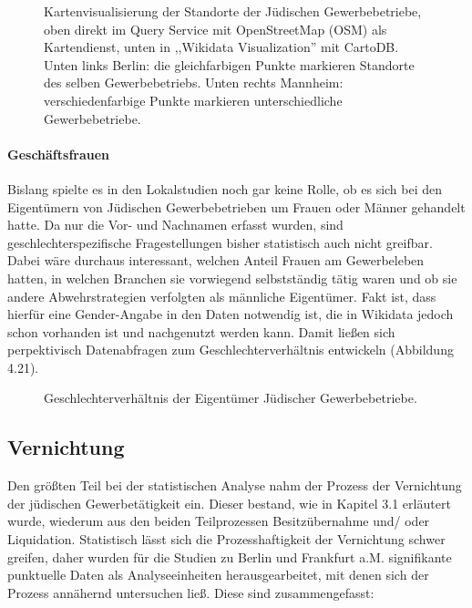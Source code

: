 \begin{figure}[h]
    \centering
    \caption{Kartenvisualisierung der Standorte der Jüdischen Gewerbebetriebe, oben direkt im Query Service mit OpenStreetMap (OSM) als Kartendienst, unten in ,,Wikidata Visualization'' mit CartoDB. Unten links Berlin: die gleichfarbigen Punkte markieren Standorte des selben Gewerbebetriebs. Unten rechts Mannheim: verschiedenfarbige Punkte markieren unterschiedliche Gewerbebetriebe.}
    \label{fig:x cubed graph}
\end{figure}

\paragraph{Geschäftsfrauen}
Bislang spielte es in den Lokalstudien noch gar keine Rolle, ob es sich bei den Eigentümern von Jüdischen Gewerbebetrieben um Frauen oder Männer gehandelt hatte. Da nur die Vor- und Nachnamen erfasst wurden, sind geschlechterspezifische Fragestellungen bisher statistisch auch nicht greifbar. Dabei wäre durchaus interessant, welchen Anteil Frauen am Gewerbeleben hatten, in welchen Branchen sie vorwiegend selbstständig tätig waren und ob sie andere Abwehrstrategien verfolgten als männliche Eigentümer. Fakt ist, dass hierfür eine Gender-Angabe in den Daten notwendig ist, die in Wikidata jedoch schon vorhanden ist und nachgenutzt werden kann. Damit ließen sich perpektivisch Datenabfragen zum Geschlechterverhältnis entwickeln (Abbildung 4.21). 

\begin{figure}[h]
    \centering
    \caption{Geschlechterverhältnis der Eigentümer Jüdischer Gewerbebetriebe.}
    \label{fig:x cubed graph}
\end{figure}

\subsection{Vernichtung}

Den größten Teil bei der statistischen Analyse nahm der Prozess der Vernichtung der jüdischen Gewerbetätigkeit ein. Dieser bestand, wie in Kapitel 3.1 erläutert wurde, wiederum aus den beiden Teilprozessen Besitzübernahme und/ oder Liquidation. Statistisch lässt sich die Prozesshaftigkeit der Vernichtung schwer greifen, daher wurden für die Studien zu Berlin und Frankfurt a.M. signifikante punktuelle Daten als Analyseeinheiten herausgearbeitet, mit denen sich der Prozess annähernd untersuchen ließ. Diese sind zusammengefasst:

